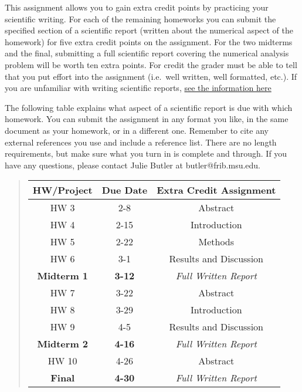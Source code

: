 \documentclass[%
oneside,                 %
final,                   %
10pt]{article}
\begin{document}
This assignment allows you to gain extra credit points by practicing
your scientific writing.  For each of the remaining homeworks you can
submit the specified section of a scientific report (written about the
numerical aspect of the homework) for five extra credit points on the
assignment.  For the two midterms and the final, submitting a full
scientific report covering the numerical analysis problem will be
worth ten extra points.  For credit the grader must be able to tell
that you put effort into the assignment (i.e.~well written, well
formatted, etc.).  If you are unfamiliar with writing scientific
reports, \href{{https://github.com/mhjensen/Physics321/blob/master/doc/Homeworks/ExtraCredits/IntroductionScientificWriting.md}}{see the information here}

The following table explains what aspect of a scientific report is due
with which homework.  You can submit the assignment in any format you
like, in the same document as your homework, or in a different one.
Remember to cite any external references you use and include a
reference list.  There are no length requirements, but make sure what
you turn in is complete and through.  If you have any questions,
please contact Julie Butler at butler@frib.msu.edu.


\begin{quote}
\begin{tabular}{ccc}
\hline
\multicolumn{1}{c}{ HW/Project } & \multicolumn{1}{c}{ Due Date } & \multicolumn{1}{c}{ Extra Credit Assignment } \\
\hline
HW 3               & 2-8           & Abstract                   \\
HW 4               & 2-15          & Introduction               \\
HW 5               & 2-22          & Methods                    \\
HW 6               & 3-1           & Results and Discussion     \\
\textbf{Midterm 1} & \textbf{3-12} & \emph{Full Written Report} \\
HW 7               & 3-22          & Abstract                   \\
HW 8               & 3-29          & Introduction               \\
HW 9               & 4-5           & Results and Discussion     \\
\textbf{Midterm 2} & \textbf{4-16} & \emph{Full Written Report} \\
HW 10              & 4-26          & Abstract                   \\
\textbf{Final}     & \textbf{4-30} & \emph{Full Written Report} \\
\hline
\end{tabular}
\end{quote}
\end{document}
